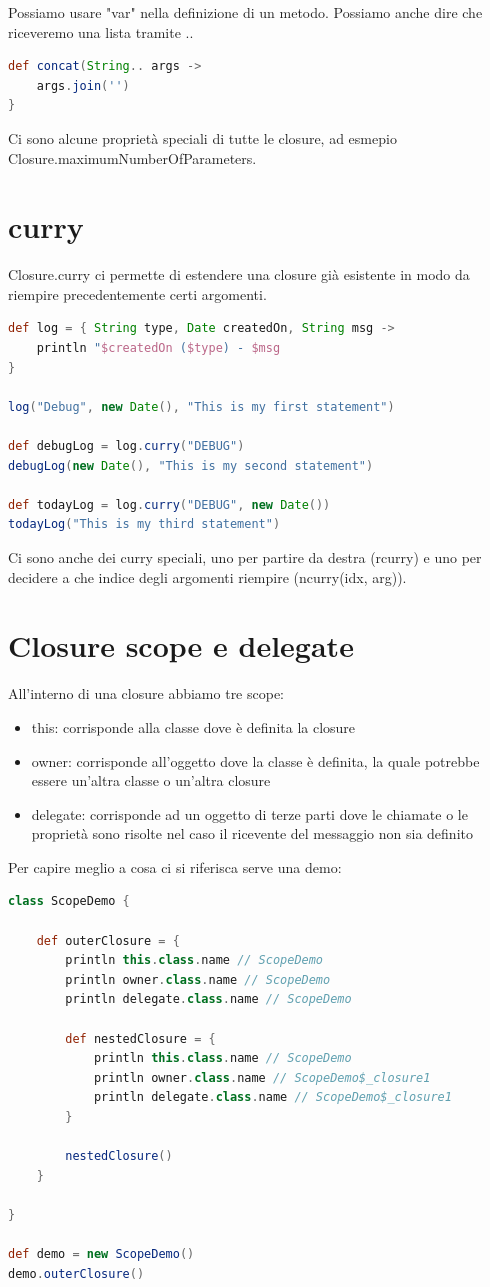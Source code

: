 \documentclass[11pt,a4paper]{book}
\begin{document}
Possiamo usare "var" nella definizione di un metodo. Possiamo anche dire che riceveremo una lista tramite ..
\begin{lstlisting}[language = groovy]
def concat(String.. args ->
	args.join('')
}
\end{lstlisting}

Ci sono alcune proprietà speciali di tutte le closure, ad esmepio Closure.maximumNumberOfParameters.

\section{curry}
Closure.curry ci permette di estendere una closure già esistente in modo da riempire precedentemente certi argomenti.
\begin{lstlisting}[language = groovy]
def log = { String type, Date createdOn, String msg ->
	println "$createdOn ($type) - $msg
}

log("Debug", new Date(), "This is my first statement")

def debugLog = log.curry("DEBUG")
debugLog(new Date(), "This is my second statement")

def todayLog = log.curry("DEBUG", new Date())
todayLog("This is my third statement")
\end{lstlisting}

Ci sono anche dei curry speciali, uno per partire da destra (rcurry) e uno per decidere a che indice degli argomenti riempire (ncurry(idx, arg)).

\section{Closure scope e delegate}
All'interno di una closure abbiamo tre scope:
\begin{itemize}
	\item this: corrisponde alla classe dove è definita la closure
	\item owner: corrisponde all'oggetto dove la classe è definita, la quale potrebbe essere un'altra classe o un'altra closure
	\item delegate: corrisponde ad un oggetto di terze parti dove le chiamate o le proprietà sono risolte nel caso il ricevente del messaggio non sia definito
\end{itemize}

Per capire meglio a cosa ci si riferisca serve una demo:
\begin{lstlisting}[language = groovy]
class ScopeDemo {

    def outerClosure = {
        println this.class.name // ScopeDemo
        println owner.class.name // ScopeDemo
        println delegate.class.name // ScopeDemo
        
        def nestedClosure = {
            println this.class.name // ScopeDemo
            println owner.class.name // ScopeDemo$_closure1
            println delegate.class.name // ScopeDemo$_closure1
        }
        
        nestedClosure()
    }
   
}

def demo = new ScopeDemo()
demo.outerClosure()
\end{lstlisting}
\end{document}
